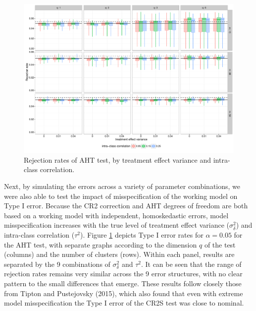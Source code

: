 \documentclass[draft]{ectaart}\usepackage[]{graphicx}\usepackage[]{color}
\newenvironment{knitrout}{}{} %
\begin{document}
\begin{knitrout}
\color{fgcolor}\begin{figure}

{\centering \includegraphics[width=\linewidth]{CR_fig/misspecification-1} 

}

\caption[Rejection rates of AHT test, by treatment effect variance and intra-class correlation]{Rejection rates of AHT test, by treatment effect variance and intra-class correlation.}\label{fig:misspecification}
\end{figure}


\end{knitrout}

Next, by simulating the errors across a variety of parameter combinations, we were also able to test the impact of misspecification of the working model on Type I error.
Because the CR2 correction and AHT degrees of freedom are both based on a working model with independent, homoskedastic errors, model misspecification increases with the true level of treatment effect variance ($\sigma_\delta^2$) and intra-class correlation ($\tau^2$).
Figure \ref{fig:misspecification} depicts Type I error rates for $\alpha = 0.05$ for the AHT test, with separate graphs according to the dimension $q$ of the test (columns) and the number of clusters (rows).
Within each panel, results are separated by the 9 combinations of $\sigma_\delta^2$ and $\tau^2$. 
It can be seen that the range of rejection rates remains very similar across the 9 error structures, with no clear pattern to the small differences that emerge.
These results follow closely those from Tipton and Pustejovsky (2015), which also found that even with extreme model misspecification the Type I error of the CR2S test was close to nominal. 
\end{document}
